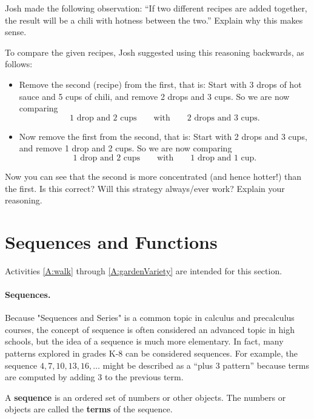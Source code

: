 \begin{problems}
\begin{enumerate}
Josh made the following observation:  ``If two different recipes are added 
together, the result will be a chili with hotness between the two.''  Explain
why this makes sense.  

To compare the given recipes, Josh suggested using this reasoning backwards, 
as follows:  
 
\begin{itemize}
\item Remove the second (recipe) from the first, that is: Start with 3
  drops of hot sauce and 5 cups of chili, and remove 2 drops and 3
  cups. So we are now comparing
\[
\text{1 drop and 2 cups}\qquad\text{with}\qquad\text{2 drops and 3 cups.}
\]
\item Now remove the first from the second, that is: Start with 2
  drops and 3 cups, and remove 1 drop and 2 cups. So we are now
  comparing
\[
\text{1 drop and 2 cups}\qquad\text{with}\qquad\text{1 drop and 1
  cup.}
\]
\end{itemize}
Now you can see that the second is more concentrated (and hence
hotter!) than the first. Is this correct? Will this strategy
always/ever work? Explain your reasoning.
\end{enumerate}
\end{problems}

\section{Sequences and Functions}

\begin{activitynote}
Activities \ref{A:walk} through \ref{A:gardenVariety} are intended for this section.  
\end{activitynote}

\paragraph{Sequences.}  Because "Sequences and Series" is a common topic in calculus and precalculus courses, the concept of sequence is often considered an advanced topic in high schools, but the idea of a sequence is much more elementary.  In fact, many patterns explored in grades K-8 can be considered sequences.  For example, the sequence $4, 7, 10, 13, 16, \dots$ might be described as a ``plus 3 pattern'' because terms are computed by adding 3 to the previous term.  
\begin{definition}
A \textbf{sequence} is an ordered set of numbers or other objects.  The numbers or objects are called the \textbf{terms} of the sequence.  
\end{definition}

